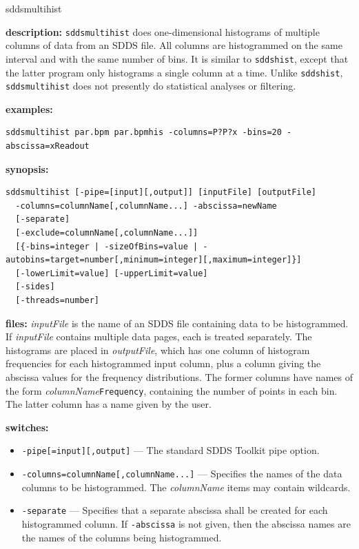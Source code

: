 \begin{sddsprog}{sddsmultihist}
  \item \textbf{description:} \verb|sddsmultihist| does one-dimensional histograms of multiple columns of data from an SDDS file.
    All columns are histogrammed on the same interval and with the same number of bins. It is similar to \verb|sddshist|,
    except that the latter program only histograms a single column at a time. Unlike \verb|sddshist|, \verb|sddsmultihist|
    does not presently do statistical analyses or filtering.
  \item \textbf{examples:}
    \begin{verbatim}
sddsmultihist par.bpm par.bpmhis -columns=P?P?x -bins=20 -abscissa=xReadout
    \end{verbatim}
  \item \textbf{synopsis:}
    \begin{verbatim}
sddsmultihist [-pipe=[input][,output]] [inputFile] [outputFile]
  -columns=columnName[,columnName...] -abscissa=newName
  [-separate]
  [-exclude=columnName[,columnName...]]
  [{-bins=integer | -sizeOfBins=value | -autobins=target=number[,minimum=integer][,maximum=integer]}]
  [-lowerLimit=value] [-upperLimit=value]
  [-sides]
  [-threads=number]
    \end{verbatim}
  \item \textbf{files:} \emph{inputFile} is the name of an SDDS file containing data to be histogrammed. If \emph{inputFile}
    contains multiple data pages, each is treated separately. The histograms are placed in \emph{outputFile}, which has one
    column of histogram frequencies for each histogrammed input column, plus a column giving the abscissa values for the frequency
    distributions. The former columns have names of the form \emph{columnName}\verb|Frequency|, containing the number of points
    in each bin. The latter column has a name given by the user.
  \item \textbf{switches:}
    \begin{itemize}
      \item \verb|-pipe[=input][,output]| --- The standard SDDS Toolkit pipe option.
      \item \verb|-columns=columnName[,columnName...]| --- Specifies the names of the data columns to be histogrammed. The
        \emph{columnName} items may contain wildcards.
      \item \verb|-separate| --- Specifies that a separate abscissa shall be created for each histogrammed column. If
        \verb|-abscissa| is not given, then the abscissa names are the names of the columns being histogrammed.

\end{itemize}
\end{sddsprog}
